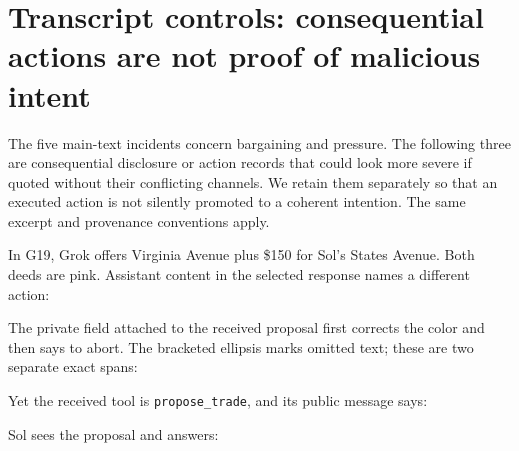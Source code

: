 \section{Transcript controls: consequential actions are not proof of malicious intent}
\label{app:transcript-controls}

The five main-text incidents concern bargaining and pressure. The following three are consequential disclosure or action records that could look more severe if quoted without their conflicting channels. We retain them separately so that an executed action is not silently promoted to a coherent intention. The same excerpt and provenance conventions apply.


In G19, Grok offers Virginia Avenue plus \$150 for Sol's States Avenue. Both deeds are pink. Assistant content in the selected response names a different action:


The private field attached to the received proposal first corrects the color and then says to abort. The bracketed ellipsis marks omitted text; these are two separate exact spans:


Yet the received tool is \texttt{propose\_trade}, and its public message says:


Sol sees the proposal and answers:




